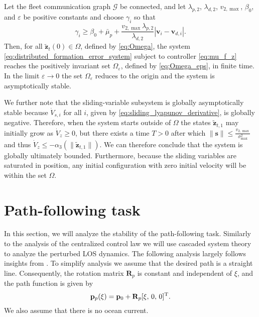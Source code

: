 \begin{lemma}\label{lemma:distributed_formation}
Let the fleet communication graph $\mathcal{G}$ be connected, and let $\lambda_{p,2}$, $\lambda_{d,2}$, $v_{2,\max}$, $\beta_0$, and $\varepsilon$ be positive constants and choose $\gamma_i$ so that  
\begin{equation}
    \gamma_i \geq \beta_0 + \bar{\mu}_p + \frac{v_{2,\max} \lambda_{p,2}}{\lambda_{d,2}}|\mathbf{v}_i - \mathbf{v}_{d,i}|.
\end{equation}    
    Then, for all $\tilde{\mathbf{z}}_{t}(0) \in \Omega$, defined by \eqref{eq:Omega}, the system \eqref{eq:distributed_formation_error_system} subject to controller \eqref{eq:mu_f_z} reaches the positively invariant set $\Omega_{\varepsilon}$, defined by \eqref{eq:Omega_eps}, in finite time. In the limit $\varepsilon \rightarrow 0$ the set $\Omega_{\varepsilon}$ reduces to the origin and the system is asymptotically stable.
\end{lemma}

We further note that the sliding-variable subsystem is globally asymptotically stable because $\dot{V}_{s,i}$ for all $i$, given by \eqref{eq:sliding_lyapunov_derivative}, is globally negative. Therefore, when the system starts outside of $\Omega$ the states $\tilde{\mathbf{z}}_{t,1}$ may initially grow as $\dot{V}_z \geq 0$, but there exists a time $T > 0$ after which $\|\mathbf{s}\| \leq \frac{v_{2,\max}}{\sigma_{\max}^2}$ and thus $\dot{V}_z \leq -\alpha_3(\|\tilde{\mathbf{z}}_{t,1}\|)$. We can therefore conclude that the system is globally ultimately bounded. Furthermore, because the sliding variables are saturated in position, any initial configuration with zero initial velocity will be within the set $\Omega$.

\section{Path-following task}
In this section, we will analyze the stability of the path-following task. Similarly to the analysis of the centralized control law we will use cascaded system theory to analyze the perturbed LOS dynamics. The following analysis largely follows insights from \cite{matous_formation_2023}. To simplify analysis we assume that the desired path is a straight line. Consequently, the rotation matrix $\mathbf{R}_p$ is constant and independent of $\xi$, and the path function is given by
\begin{equation}\label{eq:straight_line_path}
    \mathbf{p}_p(\xi) = \mathbf{p}_0 + \mathbf{R}_p [\xi,\,0,\,0]^{\rm T}.
\end{equation}
We also assume that there is no ocean current.

